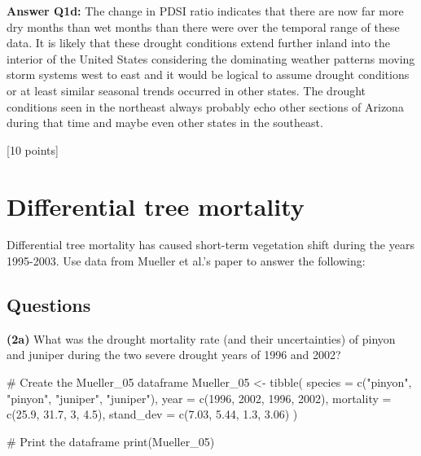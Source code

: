 \documentclass[
  letterpaper,
  DIV=11,
  numbers=noendperiod]{scrartcl}
\newenvironment{Shaded}{\begin{snugshade}}{\end{snugshade}}
\newcommand{\AttributeTok}[1]{\textcolor[rgb]{0.40,0.45,0.13}{#1}}
\newcommand{\CommentTok}[1]{\textcolor[rgb]{0.37,0.37,0.37}{#1}}
\newcommand{\DecValTok}[1]{\textcolor[rgb]{0.68,0.00,0.00}{#1}}
\newcommand{\FloatTok}[1]{\textcolor[rgb]{0.68,0.00,0.00}{#1}}
\newcommand{\FunctionTok}[1]{\textcolor[rgb]{0.28,0.35,0.67}{#1}}
\newcommand{\NormalTok}[1]{\textcolor[rgb]{0.00,0.23,0.31}{#1}}
\newcommand{\OtherTok}[1]{\textcolor[rgb]{0.00,0.23,0.31}{#1}}
\newcommand{\StringTok}[1]{\textcolor[rgb]{0.13,0.47,0.30}{#1}}
\begin{document}
\textbf{Answer Q1d:} The change in PDSI ratio indicates that there are
now far more dry months than wet months than there were over the
temporal range of these data. It is likely that these drought conditions
extend further inland into the interior of the United States considering
the dominating weather patterns moving storm systems west to east and it
would be logical to assume drought conditions or at least similar
seasonal trends occurred in other states. The drought conditions seen in
the northeast always probably echo other sections of Arizona during that
time and maybe even other states in the southeast.

{[}10 points{]}

\hypertarget{differential-tree-mortality}{%
\section{Differential tree
mortality}\label{differential-tree-mortality}}

Differential tree mortality has caused short-term vegetation shift
during the years 1995-2003. Use data from Mueller et al.'s paper to
answer the following:

\hypertarget{questions-1}{%
\subsection{Questions}\label{questions-1}}

\textbf{(2a)} What was the drought mortality rate (and their
uncertainties) of pinyon and juniper during the two severe drought years
of 1996 and 2002?

\begin{Shaded}
\begin{Highlighting}[]
\CommentTok{\# Create the Mueller\_05 dataframe}
\NormalTok{Mueller\_05 }\OtherTok{\textless{}{-}} \FunctionTok{tibble}\NormalTok{(}
  \AttributeTok{species =} \FunctionTok{c}\NormalTok{(}\StringTok{"pinyon"}\NormalTok{, }\StringTok{"pinyon"}\NormalTok{, }\StringTok{"juniper"}\NormalTok{, }\StringTok{"juniper"}\NormalTok{),}
  \AttributeTok{year =} \FunctionTok{c}\NormalTok{(}\DecValTok{1996}\NormalTok{, }\DecValTok{2002}\NormalTok{, }\DecValTok{1996}\NormalTok{, }\DecValTok{2002}\NormalTok{),}
  \AttributeTok{mortality =} \FunctionTok{c}\NormalTok{(}\FloatTok{25.9}\NormalTok{, }\FloatTok{31.7}\NormalTok{, }\DecValTok{3}\NormalTok{, }\FloatTok{4.5}\NormalTok{),}
  \AttributeTok{stand\_dev =} \FunctionTok{c}\NormalTok{(}\FloatTok{7.03}\NormalTok{, }\FloatTok{5.44}\NormalTok{, }\FloatTok{1.3}\NormalTok{, }\FloatTok{3.06}\NormalTok{)}
\NormalTok{)}

\CommentTok{\# Print the dataframe}
\FunctionTok{print}\NormalTok{(Mueller\_05)}
\end{Highlighting}
\end{Shaded}
\end{document}
